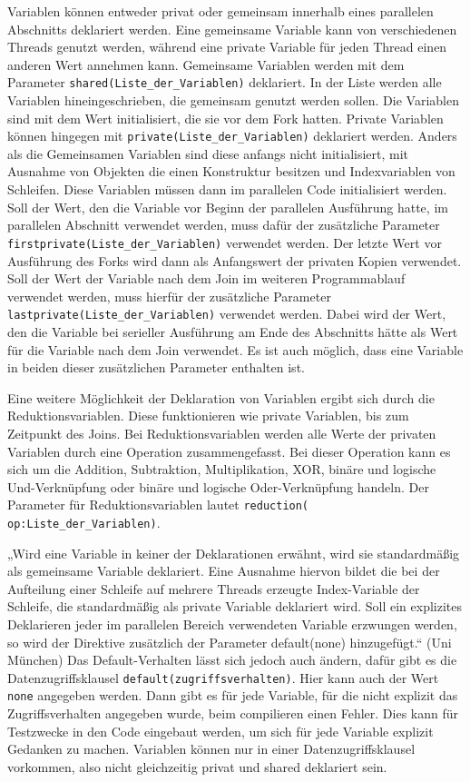 \documentclass[../main.tex]{subfiles}
\begin{document}
Variablen können entweder privat oder gemeinsam innerhalb eines parallelen Abschnitts deklariert werden. Eine gemeinsame Variable kann von verschiedenen Threads genutzt werden, während eine private Variable für jeden Thread einen anderen Wert annehmen kann. Gemeinsame Variablen werden mit dem Parameter \texttt{shared(Liste\_der\_Variablen)} deklariert. In der Liste werden alle Variablen hineingeschrieben, die gemeinsam genutzt werden sollen. Die Variablen sind mit dem Wert initialisiert, die sie vor dem Fork hatten. Private Variablen können hingegen mit \texttt{private(Liste\_der\_Variablen)} deklariert werden.  Anders als die Gemeinsamen Variablen sind diese anfangs nicht initialisiert, mit Ausnahme von Objekten die einen Konstruktur besitzen und Indexvariablen von Schleifen. Diese Variablen müssen dann im parallelen Code initialisiert werden. 
Soll der Wert, den die Variable vor Beginn der parallelen Ausführung hatte, im parallelen Abschnitt verwendet werden, muss dafür der zusätzliche Parameter \texttt{firstprivate(Liste\_der\_Variablen)} verwendet werden. Der letzte Wert vor Ausführung des Forks wird dann als Anfangswert der privaten Kopien verwendet. Soll der Wert der Variable nach dem Join im weiteren Programmablauf verwendet werden, muss hierfür der zusätzliche Parameter \texttt{lastprivate(Liste\_der\_Variablen)} verwendet werden. Dabei wird der Wert, den die Variable bei serieller Ausführung am Ende des Abschnitts hätte als Wert für die Variable nach dem Join verwendet. Es ist auch möglich, dass eine Variable in beiden dieser zusätzlichen Parameter enthalten ist.

Eine weitere Möglichkeit der Deklaration von Variablen ergibt sich durch die Reduktionsvariablen. Diese funktionieren wie private Variablen, bis zum Zeitpunkt des Joins. Bei Reduktionsvariablen werden alle Werte der privaten Variablen durch eine Operation zusammengefasst. Bei dieser Operation kann es sich um die Addition, Subtraktion, Multiplikation, XOR, binäre und logische Und-Verknüpfung oder binäre und logische Oder-Verknüpfung handeln. Der Parameter für Reduktionsvariablen lautet \texttt{reduction( op:Liste\_der\_Variablen)}.

„Wird eine Variable in keiner der Deklarationen erwähnt, wird sie standardmäßig als gemeinsame Variable deklariert. Eine Ausnahme hiervon bildet die bei der Aufteilung einer Schleife auf mehrere Threads erzeugte Index-Variable der Schleife, die standardmäßig als private Variable deklariert wird. Soll ein explizites Deklarieren jeder im parallelen Bereich verwendeten Variable erzwungen werden, so wird der Direktive zusätzlich der Parameter default(none) hinzugefügt.“ (Uni München)
Das Default-Verhalten lässt sich jedoch auch ändern, dafür gibt es die Datenzugriffsklausel \texttt{default(zugriffsverhalten)}. Hier kann auch der Wert \texttt{none} angegeben werden. Dann gibt es für jede Variable, für die nicht explizit das Zugriffsverhalten angegeben wurde, beim compilieren einen Fehler. Dies kann für Testzwecke in den Code eingebaut werden, um sich für jede Variable explizit Gedanken zu machen.
Variablen können nur in einer Datenzugriffsklausel vorkommen, also nicht gleichzeitig privat und shared deklariert sein.
\end{document}
